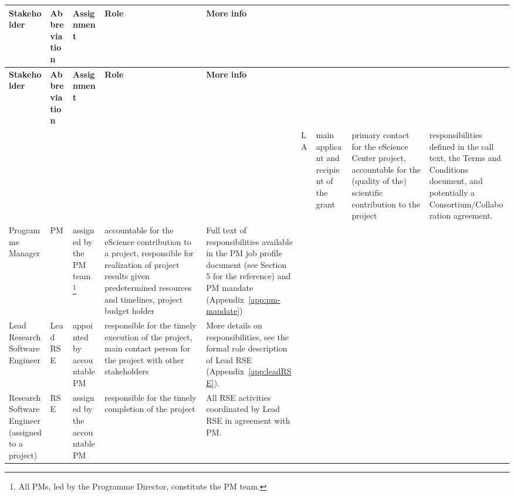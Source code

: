 \begin{tabularx}{\linewidth}{p{}|p{}|p{}|p{}|p{}}
\toprule
\textbf{Stakeholder} & \textbf{Abbreviation} & \textbf{Assignment}& \textbf{Role}& \textbf{More info}\\
\midrule
\endfirsthead
\toprule
\textbf{Stakeholder} & \textbf{Abbreviation} & \textbf{Assignment}& \textbf{Role}& \textbf{More info}\\
\toprule
\endhead
\midrule
\multicolumn{5}{r}{}
\endfoot
\bottomrule
\endlastfoot  
Lead Applicant & LA & main applicant and recipient of the grant & primary contact for the eScience Center project, accountable for the (quality of the) scientific contribution to the project & responsibilities defined in the call text, the Terms and Conditions document, and potentially a Consortium/Collaboration agreement.  \\\hline
Programme Manager                                  & PM                    & assigned by the PM team~\footnote{All PMs, led by the Programme Director, constitute the PM team.}                                                                                          & accountable for the eScience contribution to a project, responsible for realization of project results given predetermined resources and timelines, project budget holder                                                              & Full text of responsibilities available in the PM job profile document (see Section 5 for the reference) and PM mandate (Appendix~\ref{app:pm-mandate}) \\\hline
Lead Research Software Engineer                    & Lead RSE              & appointed by accountable PM                                                                                       & responsible for the timely execution of the project, main contact person for the project with other stakeholders                                                                                                                       & More details on responsibilities, see the formal role description of Lead RSE (Appendix~\ref{app:leadRSE}).                          \\\hline
Research Software Engineer (assigned to a project) & RSE                   & assigned by the accountable PM                                                                                    & responsible for the timely completion of the project                                                                                                                                                                                   & All RSE activities coordinated by Lead RSE in agreement with PM.                                                                     \\\hline

\end{tabularx}
